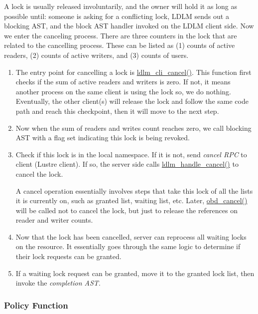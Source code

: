 A lock is usually released involuntarily, and the owner will hold it as long as
possible until: someone is asking for a conflicting lock, LDLM sends out
a blocking AST, and the block AST handler invoked on the LDLM client side. Now we enter
the canceling process.  There are three counters in the lock that are related
to the cancelling process. These can be listed as (1) counts of active
readers, (2) counts of active writers, and (3) counts of users.

\begin{enumerate}

\item The entry point for cancelling a lock is \url{ldlm_cli_cancel()}. This
function first checks if the sum of active readers and writers is zero. If not,
it means another process on the same client is using the lock so, we do
nothing.  Eventually, the other client(s) will release the lock and follow the
same code path and reach this checkpoint, then it will move to the next
step.

\item Now when the sum of readers and writes count reaches zero, we call blocking
AST with a flag set indicating this lock is being revoked. 

\item Check if this lock is in the local namespace. If it is not, send
\textit{cancel RPC} to client (Lustre client). If so, the server side calls
\url{ldlm_handle_cancel()} to cancel the lock.

A cancel operation essentially involves steps that take this lock of all the
lists it is currently on, such as granted list, waiting list, etc. Later,
\url{obd_cancel()} will be called not to cancel the lock, but just to release
the references on reader and writer counts.

\item Now that the lock has been cancelled, server can reprocess all waiting locks
on the resource. It essentially goes through the same logic to determine if
their lock requests can be granted.

\item If a waiting lock request can be granted, move it to the granted lock
list, then invoke the \textit{completion AST}.

\end{enumerate}

\subsubsection{Policy Function}

